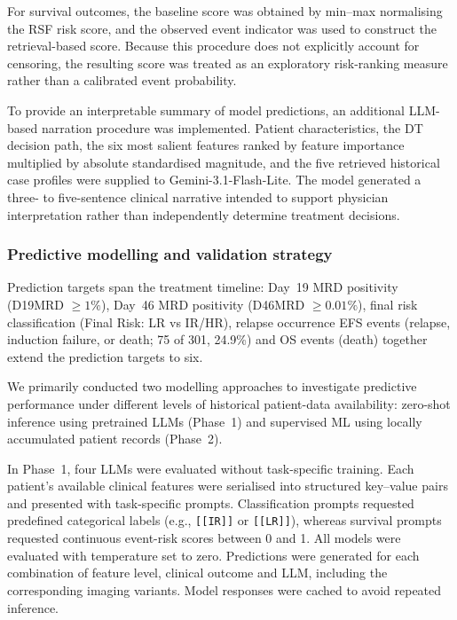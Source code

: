 \documentclass[pdflatex,sn-nature]{sn-jnl}
\begin{document}
For survival outcomes, the baseline score was obtained by min--max normalising the RSF risk score, and the observed event indicator was used to construct the retrieval-based score. Because this procedure does not explicitly account for censoring, the resulting score was treated as an exploratory risk-ranking measure rather than a calibrated event probability.

To provide an interpretable summary of model predictions, an additional LLM-based narration procedure was implemented. Patient characteristics, the DT decision path, the six most salient features ranked by feature importance multiplied by absolute standardised magnitude, and the five retrieved historical case profiles were supplied to Gemini-3.1-Flash-Lite. The model generated a three- to five-sentence clinical narrative intended to support physician interpretation rather than independently determine treatment decisions.
\fi


\subsubsection{Predictive modelling and validation strategy}
\label{sec:prediction_models}

Prediction targets span the treatment timeline: Day~19 MRD positivity (D19MRD $\geq 1\%$), Day~46 MRD positivity (D46MRD $\geq 0.01\%$), final risk classification (Final Risk: LR vs IR/HR), relapse occurrence EFS events (relapse, induction failure, or death; 75 of 301, 24.9\%) and OS events (death) together extend the prediction targets to six.

We primarily conducted two modelling approaches to investigate predictive performance under different levels of historical patient-data availability: zero-shot inference using pretrained LLMs (Phase~1) and supervised ML using locally accumulated patient records (Phase~2).

In Phase~1, four LLMs were evaluated without task-specific training. Each patient's available clinical features were serialised into structured key--value pairs and presented with task-specific prompts. Classification prompts requested predefined categorical labels (e.g., \texttt{[[IR]]} or \texttt{[[LR]]}), whereas survival prompts requested continuous event-risk scores between 0 and 1. All models were evaluated with temperature set to zero. Predictions were generated for each combination of feature level, clinical outcome and LLM, including the corresponding imaging variants. Model responses were cached to avoid repeated inference.
\end{document}
